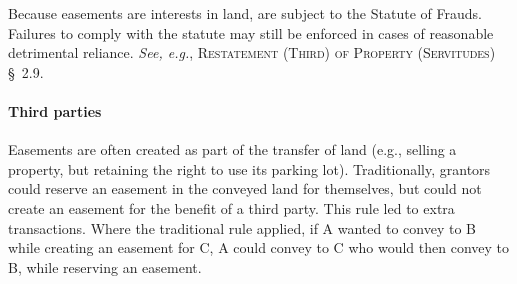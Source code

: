 Because easements are interests in land,  are subject to the
Statute of Frauds. Failures to comply with the statute may still be enforced in
cases of reasonable detrimental reliance. \textit{See, e.g.},
\textsc{Restatement (Third) of Property (Servitudes)} \S~2.9. 

\paragraph{Third parties}
Easements are often created as part of the transfer of land (e.g., selling a
property, but retaining the right to use its parking lot). Traditionally,
grantors could reserve an easement in the conveyed land for themselves, but
could not create an easement for the benefit of a third party. This rule led to
extra transactions. Where the traditional rule applied, if A wanted to convey to
B while creating an easement for C, A could convey to C who would then convey to
B, while reserving an easement. 


